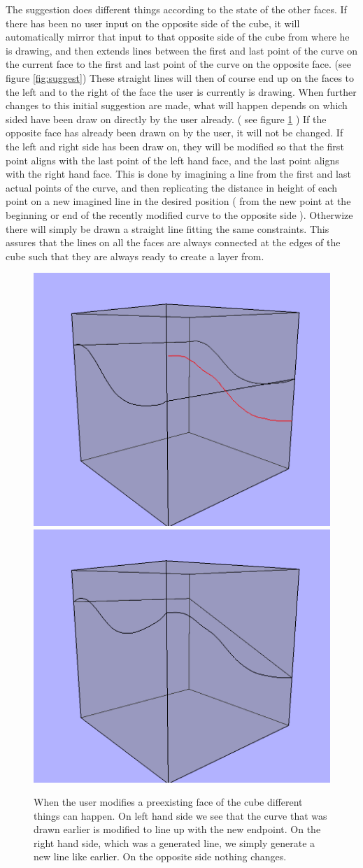 \documentclass[a4paper,12pt]{article}
\begin{document}
The suggestion does different things according to the state of the other faces. If there has been no user input on the opposite side of the cube, it will automatically mirror that input to that opposite side of the cube from where he is drawing, and then extends lines between the first and last point of the curve on the current face to the first and last point of the curve on the opposite face. (see figure \ref{fig:suggest}) These straight lines will then of course end up on the faces to the left and to the right of the face the user is currently is drawing. When further changes to this initial suggestion are made, what will happen depends on which sided have been draw on directly by the user already. ( see figure \ref{fig:layerModify} ) If the opposite face has already been drawn on by the user, it will not be changed. If the left and right side has been draw on, they will be modified so that the first point aligns with the last point of the left hand face, and the last point aligns with the right hand face.
 This is done by imagining a line from the first and last actual points of the curve, and then replicating the distance in height of each point on a new imagined line in the desired position ( from the new point at the beginning or end of the recently modified curve to the opposite side ). Otherwize there will simply be drawn a straight line fitting the same 
constraints. This assures that the lines on all the faces are always connected at the edges of the cube such that they are always ready to create a layer from.

\begin{figure}
\includegraphics[width=.5\linewidth]{thesis/modification1.png}
\includegraphics[width=.5\linewidth]{thesis/modification2.png}
 \caption{When the user modifies a preexisting face of the cube different things can happen. On left hand side we see that the curve that was drawn earlier is modified to line up with the new endpoint. On the right hand side, which was a generated line, we simply generate a new line like earlier. On the opposite side nothing changes.}
 \label{fig:layerModify}
\end{figure}
\end{document}
